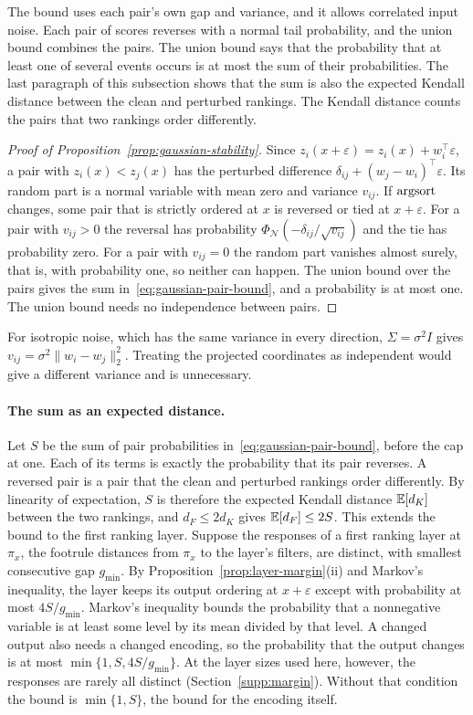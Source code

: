 The bound uses each pair's own gap and variance, and it allows correlated input noise. Each pair of scores reverses with a normal tail probability, and the union bound combines the pairs. The union bound says that the probability that at least one of several events occurs is at most the sum of their probabilities. The last paragraph of this subsection shows that the sum is also the expected Kendall distance between the clean and perturbed rankings. The Kendall distance counts the pairs that two rankings order differently.

\begin{proof}[Proof of Proposition~\ref{prop:gaussian-stability}]
Since $z_i(x+\varepsilon)=z_i(x)+w_i^{\top}\varepsilon$, a pair with $z_i(x)<z_j(x)$ has the perturbed difference $\delta_{ij}+(w_j-w_i)^{\top}\varepsilon$. Its random part is a normal variable with mean zero and variance $v_{ij}$. If $\mathrm{argsort}$ changes, some pair that is strictly ordered at $x$ is reversed or tied at $x+\varepsilon$. For a pair with $v_{ij}>0$ the reversal has probability $\Phi_{\mathcal N}(-\delta_{ij}/\sqrt{v_{ij}})$ and the tie has probability zero. For a pair with $v_{ij}=0$ the random part vanishes almost surely, that is, with probability one, so neither can happen. The union bound over the pairs gives the sum in~\eqref{eq:gaussian-pair-bound}, and a probability is at most one. The union bound needs no independence between pairs.
\end{proof}

For isotropic noise, which has the same variance in every direction, $\Sigma=\sigma^2I$ gives $v_{ij}=\sigma^2\|w_i-w_j\|_2^2$. Treating the projected coordinates as independent would give a different variance and is unnecessary.

\paragraph{The sum as an expected distance.} Let $S$ be the sum of pair probabilities in~\eqref{eq:gaussian-pair-bound}, before the cap at one. Each of its terms is exactly the probability that its pair reverses. A reversed pair is a pair that the clean and perturbed rankings order differently. By linearity of expectation, $S$ is therefore the expected Kendall distance $\mathbb{E}[d_K]$ between the two rankings, and $d_F\le2d_K$ \citep{diaconis1977footrule} gives $\mathbb{E}[d_F]\le2S$. This extends the bound to the first ranking layer. Suppose the responses of a first ranking layer at $\pi_x$, the footrule distances from $\pi_x$ to the layer's filters, are distinct, with smallest consecutive gap $g_{\min}$. By Proposition~\ref{prop:layer-margin}(ii) and Markov's inequality, the layer keeps its output ordering at $x+\varepsilon$ except with probability at most $4S/g_{\min}$. Markov's inequality bounds the probability that a nonnegative variable is at least some level by its mean divided by that level. A changed output also needs a changed encoding, so the probability that the output changes is at most $\min\{1,S,4S/g_{\min}\}$. At the layer sizes used here, however, the responses are rarely all distinct (Section~\ref{supp:margin}). Without that condition the bound is $\min\{1,S\}$, the bound for the encoding itself.

